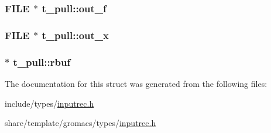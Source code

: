\hypertarget{structt__pull_a99c3fc4ebb485915a42270034e20b2da}{
\subsubsection[{out\-\_\-f}]{\setlength{\rightskip}{0pt plus 5cm}\-F\-I\-L\-E $\ast$ {\bf t\-\_\-pull\-::out\-\_\-f}}}\label{structt__pull_a99c3fc4ebb485915a42270034e20b2da}
\hypertarget{structt__pull_a8a09dae121a8fc67b2e9b28650807d30}{
\subsubsection[{out\-\_\-x}]{\setlength{\rightskip}{0pt plus 5cm}\-F\-I\-L\-E $\ast$ {\bf t\-\_\-pull\-::out\-\_\-x}}}\label{structt__pull_a8a09dae121a8fc67b2e9b28650807d30}
\hypertarget{structt__pull_acb4abc6f72fc42a2b1e35175cb2d3394}{
\subsubsection[{rbuf}]{ $\ast$ {\bf t\-\_\-pull\-::rbuf}}}\label{structt__pull_acb4abc6f72fc42a2b1e35175cb2d3394}


\-The documentation for this struct was generated from the following files\-:\begin{DoxyCompactItemize}
\item 
include/types/\hyperlink{include_2types_2inputrec_8h}{inputrec.\-h}\item 
share/template/gromacs/types/\hyperlink{share_2template_2gromacs_2types_2inputrec_8h}{inputrec.\-h}\end{DoxyCompactItemize}
